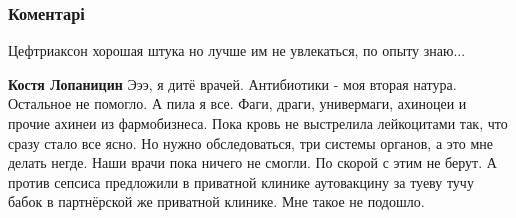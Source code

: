  
 
 
 
 
\subsubsection{Коментарі}
\label{sec:03_08_2021.fb.bilchenko_evgenia.2.foto_nimagu_turnik.cmt}

\begin{itemize}
 



 
Цефтриаксон хорошая штука но лучше им не увлекаться, по опыту знаю... \Smiley[1.0][yellow]

\begin{itemize}
 
\textbf{Костя Лопаницин} Эээ, я дитё врачей. Антибиотики - моя вторая натура. Остальное не помогло. А пила я все. Фаги, драги, универмаги, ахиноцеи и прочие ахинеи из фармобизнеса. Пока кровь не выстрелила лейкоцитами так, что сразу стало все ясно. Но нужно обследоваться, три системы органов, а это мне делать негде. Наши врачи пока ничего не смогли. По скорой с этим не берут. А против сепсиса предложили в приватной клинике аутовакцину за туеву тучу бабок в партнёрской же приватной клинике. Мне такое не подошло.

 

\end{itemize}
\end{itemize}
